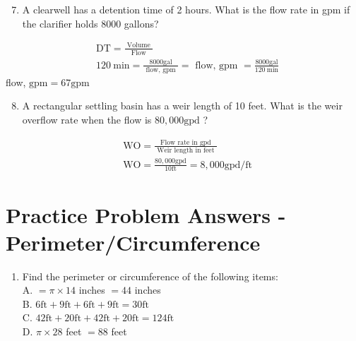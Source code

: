 \begin{enumerate}
  \setcounter{enumi}{6}
  \item A clearwell has a detention time of 2 hours. What is the flow rate in gpm if the clarifier holds 8000 gallons?
\end{enumerate}
$$
\begin{aligned}
&\mathrm{DT}=\frac{\text { Volume }}{\text { Flow }} \\
&120 \mathrm{~min}=\frac{8000 \mathrm{gal}}{\text { flow, gpm }}=\text { flow, gpm }=\frac{8000 \mathrm{gal}}{120 \mathrm{~min}}
\end{aligned}
$$
flow, $\mathrm{gpm}=67 \mathrm{gpm}$

\begin{enumerate}
  \setcounter{enumi}{7}
  \item A rectangular settling basin has a weir length of 10 feet. What is the weir overflow rate when the flow is $80,000 \mathrm{gpd}$ ?
\end{enumerate}
$$
\begin{aligned}
&\mathrm{WO}=\frac{\text { Flow rate in gpd }}{\text { Weir length in feet }} \\
&\mathrm{WO}=\frac{80,000 \mathrm{gpd}}{10 \mathrm{ft}}=8,000 \mathrm{gpd} / \mathrm{ft}
\end{aligned}
$$

\section{Practice Problem Answers - Perimeter/Circumference}
\begin{enumerate}
  \item Find the perimeter or circumference of the following items:\\
A. $=\pi \times 14$ inches $=44$ inches\\
B. $6 \mathrm{ft}+9 \mathrm{ft}+6 \mathrm{ft}+9 \mathrm{ft}=30 \mathrm{ft}$\\
C. $42 \mathrm{ft}+20 \mathrm{ft}+42 \mathrm{ft}+20 \mathrm{ft}=124 \mathrm{ft}$\\
D. $\pi \times 28$ feet $=88$ feet
\end{enumerate}
